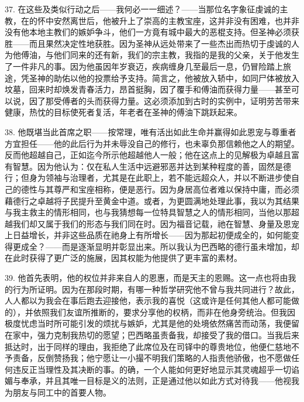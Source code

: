 37. 在这些及类似行动之后——我何必一一细述？——当那位名字象征虔诚的主教，在的怀中安然离世后，他被升上了崇高的主教宝座，这并非没有困难，也并非没有他本地主教们的嫉妒争斗，他们一方竟有城中最大的恶棍支持。但圣神必须获胜——而且果然决定性地获胜。因为圣神从远处带来了一些杰出而热切于虔诚的人为他傅油，与他们同来的还有新，我们的宗主教，我指的是我的父亲，关于他发生了一件非凡的事。因为他虽因年岁衰迈，疾病缠身几至最后一息，仍冒险踏上旅途，凭圣神的助佑以他的投票给予支持。简言之，他被放入轿中，如同尸体被放入坟墓，回来时却焕发青春活力，昂首挺胸，因了覆手和傅油而获得力量——甚至可以说，因了那受傅者的头而获得力量。这必须添加到古时的实例中，证明劳苦带来健康，热忱的目标使死者复活，年老者在圣神的傅油下跳跃起来。\par

38. 他既堪当此首席之职——按常理，唯有活出如此生命并赢得如此恩宠与尊重者方宜担任——他的此后行为并未辱没自己的修行，也未辜负那信赖他之人的期望。反而他超越自己，正如迄今所示他超越他人一般；他在这点上的见解极为卓越且富有智慧。因为他认为：仅在私人生活中远避邪恶并达到某种程度的善，固然是德行；但身为领袖与治理者，尤其是在此职上，若不能远超众人，并以不断进步使自己的德性与其尊严和宝座相称，便是恶行。因为身居高位者难以保持中庸，而必须藉德行之卓越将子民提升至黄金中道。或者，为更圆满地处理此事，我以为其结果与我主救主的情形相同，也与我猜想每一位特具智慧之人的情形相同，当他以那超越我们却又属于我们的形态与我们同在时。因为福音记载，祂在智慧、身量及恩宠上日益增长，并非这些品质在祂身上有所增长——因为那起初便成全的，如何能变得更成全？——而是逐渐显明并彰显出来。所以我认为巴西略的德行虽未增加，却在此时获得了更广泛的施展，因其权能为他提供了更丰富的素材。\par

39. 他首先表明，他的权位并非来自人的恩惠，而是天主的恩赐。这一点也将由我的行为所证明。因为在那段时期，有哪一种哲学研究他不曾与我共同进行？故此，人人都以为我会在事后跑去迎接他，表示我的喜悦（这或许是任何其他人都可能做的），并依照我们友谊所推断的，要求分享他的权柄，而非在他身旁统治。但我因极度忧虑当时所可能引发的烦扰与嫉妒，尤其是他的处境依然痛苦而动荡，我便留在家中，强力克制我热切的愿望；巴西略虽责备我，却接受了我的借口。当我后来抵达时，出于同样的理由，我拒绝了此席位及在司铎中的尊贵地位，他便仁慈地不予责备，反倒赞扬我；他宁愿让一小撮不明我们策略的人指责他骄傲，也不愿做任何违反正当理性及其决断的事。的确，一个人能如何更好地显示其灵魂超乎一切谄媚与奉承，并且其唯一目标是义的法则，正是通过他以如此方式对待我——他视我为朋友与同工中的首要人物。\par

